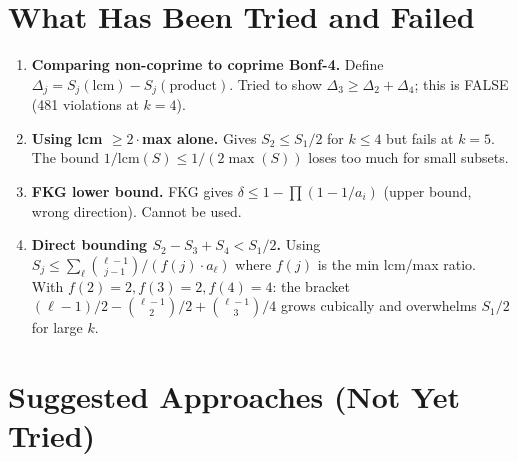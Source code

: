 \documentclass[11pt,a4paper]{article}
\theoremstyle{definition}
\begin{document}
\section{What Has Been Tried and Failed}

\begin{enumerate}
\item \textbf{Comparing non-coprime to coprime Bonf-4.} Define
$\Delta_j = S_j(\mathrm{lcm}) - S_j(\mathrm{product})$. Tried to show
$\Delta_3 \geq \Delta_2 + \Delta_4$; this is FALSE (481 violations at $k=4$).

\item \textbf{Using lcm $\geq 2\cdot$max alone.} Gives $S_2 \leq S_1/2$
for $k \leq 4$ but fails at $k = 5$. The bound $1/\mathrm{lcm}(S)
\leq 1/(2\max(S))$ loses too much for small subsets.

\item \textbf{FKG lower bound.} FKG gives $\delta \leq 1-\prod(1-1/a_i)$
(upper bound, wrong direction). Cannot be used.

\item \textbf{Direct bounding $S_2-S_3+S_4 < S_1/2$.} Using
$S_j \leq \sum_\ell \binom{\ell-1}{j-1}/(f(j) \cdot a_\ell)$ where
$f(j)$ is the min lcm/max ratio. With $f(2)=2, f(3)=2, f(4)=4$:
the bracket $({\ell-1})/{2} - \binom{\ell-1}{2}/{2} + \binom{\ell-1}{3}/{4}$
grows cubically and overwhelms $S_1/2$ for large $k$.
\end{enumerate}

\section{Suggested Approaches (Not Yet Tried)}
\end{document}
